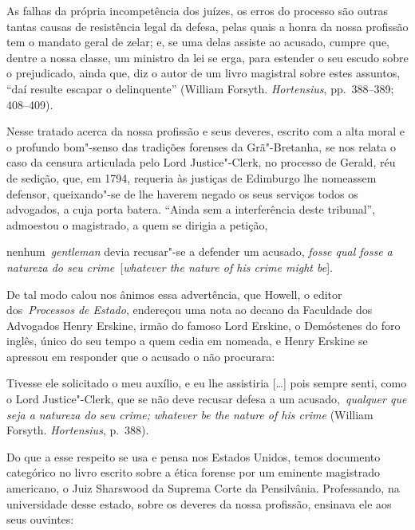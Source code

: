 As falhas da própria incompetência
dos juízes, os erros do processo são outras tantas causas de
resistência legal da defesa, pelas quais a honra da nossa profissão tem
o mandato geral de zelar; e, se uma delas assiste ao acusado, cumpre
que, dentre a nossa classe, um ministro da lei se erga, para estender o
seu escudo sobre o prejudicado, ainda que, diz o autor de um livro
magistral sobre estes assuntos, “daí resulte escapar o delinquente”
(William Forsyth. \textit{Hortensius}, pp.~388--389; 408--409). 

Nesse tratado acerca da nossa profissão e seus deveres, escrito com a alta moral e o
profundo bom"-senso das tradições forenses da Grã"-Bretanha, se nos
relata o caso da censura articulada pelo Lord Justice"-Clerk, no
processo de Gerald, réu de sedição, que, em 1794, requeria às justiças
de Edimburgo lhe nomeassem defensor, queixando"-se de lhe haverem
negado os seus serviços todos os advogados, a cuja porta batera.
“Ainda sem a interferência deste tribunal”, admoestou o magistrado, a
quem se dirigia a petição, 

\begin{hedraquote}
nenhum \textit{gentleman} devia recusar"-se a
defender um acusado, \textit{fosse qual fosse a natureza do
seu crime} [\textit{whatever the nature of his crime might be}].
\end{hedraquote}

 De tal modo calou nos ânimos essa advertência, que Howell, o
editor dos \textit{Processos de Estado}, endereçou uma nota ao decano
da Faculdade dos Advogados Henry Erskine, irmão do famoso Lord Erskine,
o Demóstenes do foro inglês, único do seu tempo a quem cedia em
nomeada, e Henry Erskine se apressou em responder que o acusado o não
procurara: 

\begin{hedraquote}
Tivesse ele solicitado o meu auxílio, e eu lhe assistiria
[\ldots] pois sempre senti, como o Lord Justice"-Clerk, que se não deve
recusar defesa a um acusado, \textit{qualquer que seja a natureza do}
\textit{seu crime}\textit{; whatever be the nature of his
crime} (William Forsyth. \textit{Hortensius}, p.~388). 
\end{hedraquote}

Do que a esse respeito se usa e pensa nos Estados Unidos, temos documento categórico
no livro escrito sobre a ética forense por um eminente magistrado
americano, o Juiz Sharswood da Suprema Corte da Pensilvânia.
Professando, na universidade desse estado, sobre os deveres da nossa
profissão, ensinava ele aos seus ouvintes: 

